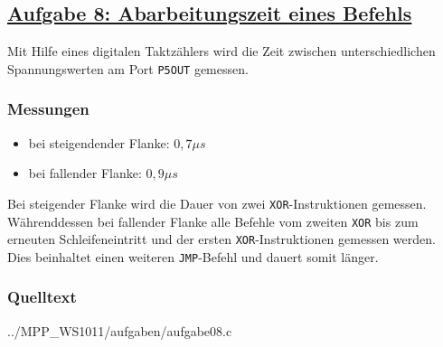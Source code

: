 \subsection*
{\href{http://cst.mi.fu-berlin.de/intern/19606-P-MPP/Aufgaben/040204.html}
{Aufgabe 8: Abarbeitungszeit eines Befehls}}

Mit Hilfe eines digitalen Taktzählers wird die Zeit zwischen unterschiedlichen Spannungswerten am Port \texttt{P5OUT} gemessen.
\subsubsection*{Messungen}
\begin{itemize}
    \item bei steigendender Flanke: $0,7 \mu s$
    \item bei fallender Flanke: $0,9 \mu s$
\end{itemize}
Bei steigender Flanke wird die Dauer von zwei \texttt{XOR}-Instruktionen gemessen.
Währenddessen bei fallender Flanke alle Befehle vom zweiten \texttt{XOR} bis zum erneuten Schleifeneintritt und der ersten \texttt{XOR}-Instruktionen gemessen werden. Dies beinhaltet einen weiteren \texttt{JMP}-Befehl und dauert somit länger.
\subsubsection*{Quelltext}


{../MPP_WS1011/aufgaben/aufgabe08.c}
